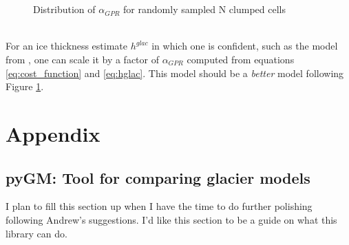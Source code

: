 \documentclass[a4, 12pt]{article}
\begin{document}
\\
\begin{figure}[h!]
\\
\caption{Distribution of $\alpha_{GPR}$ for randomly sampled N clumped cells}
\label{fig:alpha_dist_block}
\end{figure}
\\
For an ice thickness estimate $h^{glac}$ in which one is confident, such as the model from \citet{farinotti2019consensus}, one can scale it by a factor of $\alpha_{GPR}$ computed from equations \ref{eq:cost_function} and \ref{eq:hglac}. This model should be a \textit{better} model following Figure \ref{fig:alpha_dist_block}.
\FloatBarrier
\section{Appendix}
\subsection{pyGM: Tool for comparing glacier models}
I plan to fill this section up when I have the time to do further polishing following Andrew's suggestions. I'd like this section to be a guide on what this library can do.
\end{document}
